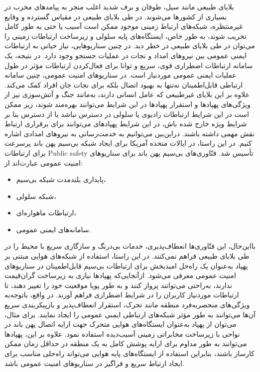 بلایای طبیعی مانند سیل، طوفان و برف شدید اغلب منجر به پیامدهای مخرب در بسیاری از کشورها می‌شوند. در طی بلایای طبیعی در مقیاس گسترده و وقایع غیرمنتظره، شبکه‌های ارتباط زمینی موجود ممکن است آسیب یا حتی به طور کامل تخریب شوند، به طور خاص، ایستگاه‌های پایه سلولی و زیرساخت ارتباطات زمینی را می‌توان در طی بلایای طبیعی در خطر دید. در چنین سناریوهایی، نیاز حیاتی به ارتباطات ایمنی عمومی بین نیروهای امداد و نجات در عملیات جستجو وجود دارد.
در نتیجه، یک سامانه ارتباطات اضطراری قوی، سریع و توانا برای فعال‌کردن ارتباطات مؤثر در طول عملیات ایمنی عمومی موردنیاز است. در سناریوهای امنیت عمومی، چنین سامانه ارتباطی قابل‌اطمینان نه‌تنها به بهبود اتصال بلکه برای نجات جان افراد کمک می‌کند. علاوه بر این بلایای غیرطبیعی که عامل انسانی دارند، به‌مانند جنگ و آتش‌سوزی نیز از ویژگی‌های پهپادها و استقرار پهپادها در این شرایط می‌توانند بهره‌مند شوند، زیر ممکن است در این شرایط ارتباطات رادیوی یا سلولی در دسترس نباشد یا از دسترس بنا بر شرایط ویژه خارج شده باش، در این شرایط پهپادهای می‌توانند برای برقراری ارتباط نقش مهمی داشته باشند. دراین‌بین می‌توانیم به خدمت‌رسانی به نیروهای امدادی اشاره کنیم.
در این راستا، در ایالات متحده آمریکا برای ایجاد شبکه بی‌سیم پهن باند پرسرعت برای ارتباطات \gls{Public safety} تأسیس شد. فنّاوری‌های بی‌سیم پهن باند برای سناریوهای امنیت عمومی عبارت‌اند از: 
\begin{itemize}
	\item 
	پایداری بلندمدت شبکه بی‌سیم، 
	\item 
	شبکه سلولی، 
	\item 
	ارتباطات ماهواره‌ای، 
	\item 
	سامانه‌های ایمنی عمومی.
\end{itemize}
بااین‌حال، این فنّاوری‌ها انعطاف‌پذیری، خدمات بی‌درنگ و سازگاری سریع با محیط را در طی بلایای طبیعی فراهم نمی‌کنند. در این راستا، استفاده از شبکه‌های هوایی مبتنی بر پهپاد به‌عنوان یک راه‌حل امیدبخش برای ارتباطات بی‌سیم قابل‌اطمینان در سناریوهای امنیت عمومی معرفی می‌شود. 
ازآنجایی‌که پهپادها نیازی به زیرساخت گران‌قیمت ندارند، به‌راحتی می‌توانند پرواز کنند و به طور پویا موقعیت خود را تغییر دهند، تا ارتباطات موردنیاز کاربران را در شرایط اضطراری فراهم آورند. در واقع، باتوجه‌به ویژگی‌های منحصربه‌فرد منطقه مانند تحرک، استقرار انعطاف‌پذیر و بازپیکربندی سریع آن‌ها می‌توانند به طور مؤثر شبکه‌های ارتباطی ایمنی عمومی را ایجاد نمایند. برای مثال، می‌توان از پهپاد به‌عنوان ایستگاه‌های هوایی متحرک جهت ارایه اتصال پهن باند در نواحی با زیرساخت مخابراتی زمینی آسیب‌دیده استفاده نمود. علاوه بر این، پهپادها می‌توانند به طور مداوم برای ارایه پوشش کامل به یک منطقه در حداقل زمان ممکن کارساز باشند، بنابراین استفاده از ایستگاه‌های پایه هوایی می‌تواند راه‌حلی مناسب برای ایجاد ارتباط سریع و فراگیر در سناریوهای امنیت عمومی باشد.
